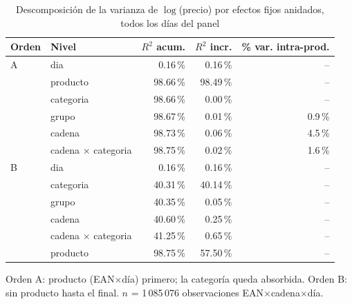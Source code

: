 \begin{table}[htbp]
\caption{Descomposici\'on de la varianza de $\log$(precio) por efectos fijos anidados, todos los d\'ias del panel}
\label{tab:varianza}
\centering\scriptsize\setlength{\tabcolsep}{3pt}
\begin{tabular}{@{}llrrr@{}}
\toprule
Orden & Nivel & $R^2$ acum. & $R^2$ incr. & \% var. intra-prod. \\
\midrule
A & dia & 0.16\,\% & 0.16\,\% & -- \\
 & producto & 98.66\,\% & 98.49\,\% & -- \\
 & categoria & 98.66\,\% & 0.00\,\% & -- \\
 & grupo & 98.67\,\% & 0.01\,\% & 0.9\,\% \\
 & cadena & 98.73\,\% & 0.06\,\% & 4.5\,\% \\
 & cadena $\times$ categoria & 98.75\,\% & 0.02\,\% & 1.6\,\% \\
\midrule
B & dia & 0.16\,\% & 0.16\,\% & -- \\
 & categoria & 40.31\,\% & 40.14\,\% & -- \\
 & grupo & 40.35\,\% & 0.05\,\% & -- \\
 & cadena & 40.60\,\% & 0.25\,\% & -- \\
 & cadena $\times$ categoria & 41.25\,\% & 0.65\,\% & -- \\
 & producto & 98.75\,\% & 57.50\,\% & -- \\
\bottomrule\end{tabular}
\par\smallskip\raggedright\scriptsize Orden A: producto (EAN$\times$d\'ia) primero; la categor\'ia queda absorbida. Orden B: sin producto hasta el final. $n$ = 1\,085\,076 observaciones EAN$\times$cadena$\times$d\'ia.
\end{table}
